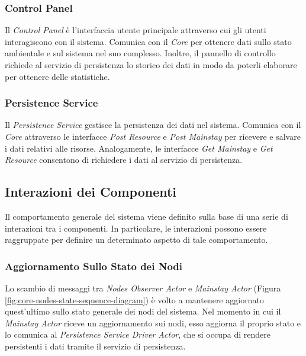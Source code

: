 \documentclass{scrartcl}
\begin{document}
\subsubsection{Control Panel}
Il \textit{Control Panel} è l'interfaccia utente principale attraverso cui gli utenti interagiscono con il sistema. Comunica con il \textit{Core} per ottenere dati sullo stato ambientale e sul sistema nel suo complesso. Inoltre, il pannello di controllo richiede al servizio di persistenza lo storico dei dati in modo da poterli elaborare per ottenere delle statistiche.

\subsubsection{Persistence Service}
Il \textit{Persistence Service} gestisce la persistenza dei dati nel sistema. Comunica con il \textit{Core} attraverso le interfacce \textit{Post Resource} e \textit{Post Mainstay} per ricevere e salvare i dati relativi alle risorse. Analogamente, le interfacce \textit{Get Mainstay} e \textit{Get Resource }consentono di richiedere i dati al servizio di persistenza.

\subsection{Interazioni dei Componenti}

Il comportamento generale del sistema viene definito sulla base di una serie di interazioni tra i componenti. In particolare, le interazioni possono essere raggruppate per definire un determinato aspetto di tale comportamento.

\subsubsection{Aggiornamento Sullo Stato dei Nodi}

Lo scambio di messaggi tra \textit{Nodes Observer Actor} e \textit{Mainstay Actor} (Figura \ref{fig:core-nodes-state-sequence-diagram}) è volto a mantenere aggiornato quest'ultimo sullo stato generale dei nodi del sistema. Nel momento in cui il \textit{Mainstay Actor} riceve un aggiornamento sui nodi, esso aggiorna il proprio stato e lo comunica al \textit{Persistence Service Driver Actor}, che si occupa di rendere persistenti i dati tramite il servizio di persistenza.
\end{document}
